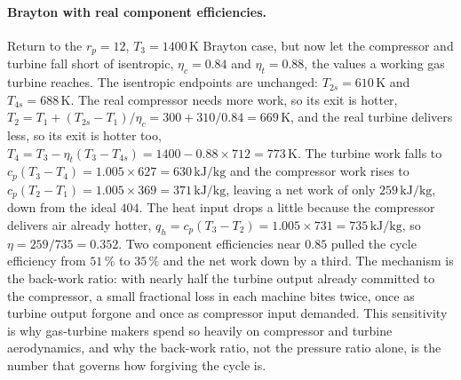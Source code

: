 \paragraph{Brayton with real component efficiencies.} Return to the
$r_p = 12$, $T_3 = 1400\,\si{\kelvin}$ Brayton case, but now let the
compressor and turbine fall short of isentropic, $\eta_c = 0.84$ and
$\eta_t = 0.88$, the values a working gas turbine reaches. The isentropic
endpoints are unchanged: $T_{2s} = 610\,\si{\kelvin}$ and $T_{4s} = 688\,
\si{\kelvin}$. The real compressor needs more work, so its exit is hotter,
$T_2 = T_1 + (T_{2s} - T_1)/\eta_c = 300 + 310/0.84 = 669\,\si{\kelvin}$,
and the real turbine delivers less, so its exit is hotter too, $T_4 = T_3
- \eta_t(T_3 - T_{4s}) = 1400 - 0.88 \times 712 = 773\,\si{\kelvin}$. The
turbine work falls to $c_p(T_3 - T_4) = 1.005 \times 627 = 630\,\text{kJ}
/\text{kg}$ and the compressor work rises to $c_p(T_2 - T_1) = 1.005
\times 369 = 371\,\text{kJ}/\text{kg}$, leaving a net work of only
$259\,\text{kJ}/\text{kg}$, down from the ideal $404$. The heat input
drops a little because the compressor delivers air already hotter,
$q_h = c_p(T_3 - T_2) = 1.005 \times 731 = 735\,\text{kJ}/\text{kg}$, so
$\eta = 259/735 = 0.352$. Two component efficiencies near $0.85$ pulled
the cycle efficiency from $51\,\%$ to $35\,\%$ and the net work down by a
third. The mechanism is the back-work ratio: with nearly half the turbine
output already committed to the compressor, a small fractional loss in
each machine bites twice, once as turbine output forgone and once as
compressor input demanded. This sensitivity is why gas-turbine makers
spend so heavily on compressor and turbine aerodynamics, and why the
back-work ratio, not the pressure ratio alone, is the number that governs
how forgiving the cycle is.

